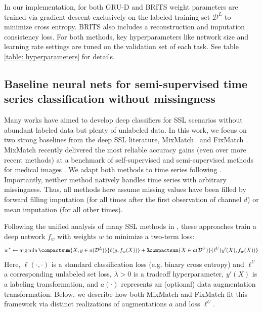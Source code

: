 In our implementation, for both GRU-D and BRITS weight parameters are trained via gradient descent exclusively on the labeled training set $\mathcal{D}^L$ to minimize cross entropy. BRITS also includes a reconstruction and imputation consistency loss. For both methods, key hyperparameters like network size and learning rate settings are tuned on the validation set of each task. See table \ref{table: hyperparameters} for details.


\subsection{Baseline neural nets for semi-supervised time series classification without missingness}
\label{sec:baselines_SSL}

Many works have aimed to develop deep classifiers for SSL scenarios without abundant labeled data but plenty of unlabeled data. In this work, we focus on two strong baselines from the deep SSL literature, MixMatch~\citep{berthelotMixMatchHolisticApproach2019} and FixMatch~\citep{sohnFixMatchSimplifyingSemisupervised2020}. MixMatch recently delivered the most reliable accuracy gains (even over more recent methods) at a benchmark of self-supervised and semi-supervised methods for medical images \citep{huang2023accuracy}.
We adapt both methods to time series following \citep{goschenhofer2021deep}.
Importantly, neither method natively handles time series with arbitrary missingness. Thus, all methods here assume missing values have been filled by forward filling imputation (for all times after the first observation of channel $d$) or mean imputation (for all other times).

Following the unified analysis of many SSL methods in \citep{zhuRichGetRicher2022}, these approaches train a deep network $f_{w}$ with weights $w$ to minimize a two-term loss:
\begin{align}
w^* \gets \arg\min \compactsum{X, y \in a(\mathcal{D}^L) }{\ell( y, f_{w}(X) )}
 + \lambda \hspace{-6pt}
 \compactsum{X \in a(\mathcal{D}^U)}{\ell^U( y'(X), f_{w}(X) )}
\end{align}
Here, $\ell(\cdot, \cdot)$ is a standard classification loss (e.g. binary cross entropy) and $\ell^U$ a corresponding unlabeled set loss, $\lambda > 0$ is a tradeoff hyperparameter, $y'(X)$ is a labeling transformation, and $a(\cdot)$ represents an (optional) data augmentation transformation. Below, we describe how both MixMatch and FixMatch fit this framework via distinct realizations of augmentations $a$ and loss $\ell^U$. 

